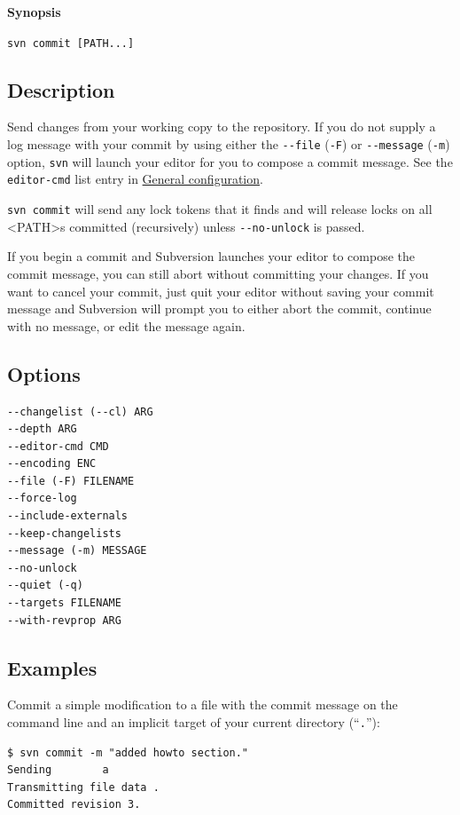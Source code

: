 \textbf{Synopsis}

\texttt{svn\ commit\ {[}PATH...{]}}

\subsection{Description}

Send changes from your working copy to the repository. If you do not
supply a log message with your commit by using either the
\texttt{-\/-file} (\texttt{-F}) or \texttt{-\/-message} (\texttt{-m})
option, \texttt{svn} will launch your editor for you to compose a commit
message. See the \texttt{editor-cmd} list entry in
\hyperref[svn.advanced.confarea.opts.config]{General configuration}.

\texttt{svn\ commit} will send any lock tokens that it finds and will
release locks on all \textless PATH\textgreater s committed
(recursively) unless \texttt{-\/-no-unlock} is passed.

If you begin a commit and Subversion launches your editor to compose the
commit message, you can still abort without committing your changes. If
you want to cancel your commit, just quit your editor without saving
your commit message and Subversion will prompt you to either abort the
commit, continue with no message, or edit the message again.

\subsection{Options}

\begin{verbatim}
--changelist (--cl) ARG
--depth ARG
--editor-cmd CMD
--encoding ENC
--file (-F) FILENAME
--force-log
--include-externals
--keep-changelists
--message (-m) MESSAGE
--no-unlock
--quiet (-q)
--targets FILENAME
--with-revprop ARG
\end{verbatim}

\subsection{Examples}

Commit a simple modification to a file with the commit message on the
command line and an implicit target of your current directory
(``\texttt{.}''):

\begin{verbatim}
$ svn commit -m "added howto section."
Sending        a
Transmitting file data .
Committed revision 3.
\end{verbatim}

